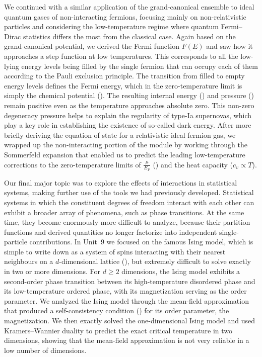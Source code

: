 We continued with a similar application of the grand-canonical ensemble to ideal quantum gases of non-interacting fermions, focusing mainly on non-relativistic particles and considering the low-temperature regime where quantum Fermi--Dirac statistics differs the most from the classical case.
Again based on the grand-canonical potential, we derived the Fermi function $F(E)$ and saw how it approaches a step function at low temperatures.
This corresponds to all the low-lying energy levels being filled by the single fermion that can occupy each of them according to the Pauli exclusion principle.
The transition from filled to empty energy levels defines the Fermi energy, which in the zero-temperature limit is simply the chemical potential ().
The resulting internal energy () and pressure () remain positive even as the temperature approaches absolute zero.
This non-zero degeneracy pressure helps to explain the regularity of type-Ia supernovas, which play a key role in establishing the existence of so-called dark energy.
After more briefly deriving the equation of state for a relativistic ideal fermion gas, we wrapped up the non-interacting portion of the module by working through the Sommerfeld expansion that enabled us to predict the leading low-temperature corrections to the zero-temperature limits of $\frac{\mu}{E_F}$ () and the heat capacity ($c_v \propto T$).

Our final major topic was to explore the effects of interactions in statistical systems, making further use of the tools we had previously developed.
Statistical systems in which the constituent degrees of freedom interact with each other can exhibit a broader array of phenomena, such as phase transitions.
At the same time, they become enormously more difficult to analyze, because their partition functions and derived quantities no longer factorize into independent single-particle contributions.
In Unit~9 we focused on the famous Ising model, which is simple to write down as a system of spins interacting with their nearest neighbours on a $d$-dimensional lattice (), but extremely difficult to solve exactly in two or more dimensions.
For $d \geq 2$ dimensions, the Ising model exhibits a second-order phase transition between its high-temperature disordered phase and its low-temperature ordered phase, with its magnetization serving as the order parameter.
We analyzed the Ising model through the mean-field approximation that produced a self-consistency condition () for its order parameter, the magnetization.
We then exactly solved the one-dimensional Ising model and used Kramers--Wannier duality to predict the exact critical temperature in two dimensions, showing that the mean-field approximation is not very reliable in a low number of dimensions.

